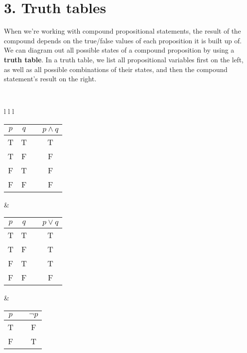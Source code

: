 \documentclass[a4paper,12pt]{book}
\begin{document}
    \newpage
    \section*{3. Truth tables}
        \begin{introNOHEAD}
            When we're working with compound propositional statements,
            the result of the compound depends on the true/false values
            of each proposition it is built up of.
            ~\\
            We can diagram out all possible states of a compound proposition
            by using a \textbf{truth table}. In a truth table, we list
            all propositional variables first on the left, as well as
            all possible combinations of their states, and then
            the compound statement's result on the right.

            ~\\

            \begin{tabular}{ l l l }

                \begin{tabular}{ | c | c | c | c | }
                    \hline
                    $p$ & $q$ & & $p \land q$ \\ \hline
                    T & T & & T \\ \hline
                    T & F & & F \\ \hline
                    F & T & & F \\ \hline
                    F & F & & F \\ \hline

                \end{tabular}
                &

                \begin{tabular}{ | c | c | c | c | }
                    \hline
                    $p$ & $q$ & & $p \lor q$ \\ \hline
                    T & T & & T \\ \hline
                    T & F & & T \\ \hline
                    F & T & & T \\ \hline
                    F & F & & F \\ \hline

                \end{tabular}
                &

                \begin{tabular}{ | c | c | c | }
                    \hline
                    $p$ & & $\neg p$ \\ \hline
                    T & & F \\ \hline
                    F & & T \\ \hline

                \end{tabular}

            \end{tabular}
        \end{introNOHEAD}
\end{document}
